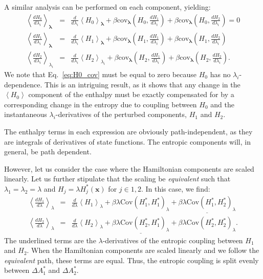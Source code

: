 \documentclass[%
 preprint,
 amsmath,amssymb,
 aps,
]{revtex4-1}
\renewcommand{\vec}[1]{{\bm{#1}}}
\begin{document}
A similar analysis can be performed on each component, yielding:
\begin{eqnarray}
\left<\frac{dH_0}{d\lambda_i}\right>_{\vec\lambda} &=& 
\frac{d}{d\lambda_i}\left<H_0\right>_{\vec\lambda} +
\beta\mathrm{cov}_{\vec\lambda}\left(H_0, \frac{dH_1}{d\lambda_i} \right)+
\beta\mathrm{cov}_{\vec\lambda}\left(H_0, \frac{dH_2}{d\lambda_i} \right)
\label{eq:H0_cov}=0\\
\left<\frac{dH_1}{d\lambda_i}\right>_{\vec\lambda} &=& 
\frac{d}{d\lambda_i}\left<H_1\right>_{\vec\lambda} +
\beta\mathrm{cov}_{\vec\lambda}\left(H_1, \frac{dH_1}{d\lambda_i} \right)+
\beta\mathrm{cov}_{\vec\lambda}\left(H_1, \frac{dH_2}{d\lambda_i} \right)\\
\left<\frac{dH_2}{d\lambda_i}\right>_{\lambda_i} &=& 
\frac{d}{d\lambda_i}\left<H_2\right>_{\lambda_i} +
\beta\mathrm{cov}_{\vec\lambda}\left(H_2, \frac{dH_1}{d\lambda_i} \right)+
\beta\mathrm{cov}_{\vec\lambda}\left(H_2, \frac{dH_2}{d\lambda_i} \right).
\end{eqnarray}
We note that Eq.~\ref{eq:H0_cov} must be equal to zero because $H_0$ has no $\lambda_i$-dependence. This is an intriguing result, as it shows that any change in the $\left<H_0\right>$ component of the enthalpy must be exactly compensated for by a corresponding change in the entropy due to coupling between $H_0$ and the instantaneous $\lambda_i$-derivatives of the perturbed components, $H_1$ and $H_2$.

The enthalpy terms in each expression are obviously path-independent, as they are integrals of derivatives of state functions. The entropic components will, in general, be path dependent.

However, let us consider the case where the Hamiltonian components are scaled linearly. Let us further stipulate that the scaling be \emph{equivalent} such that $\lambda_1 = \lambda_2 = \lambda$ and $H_j = \lambda H_j^*(\vec x)$ for $j\in{1,2}$. In this case, we find:
\begin{eqnarray}
\left<\frac{dH_1}{d\lambda}\right>_\lambda &=& 
\frac{d}{d\lambda}\left<H_1\right>_\lambda +
\beta\lambda\mathrm{Cov}\left(H_1^*,H_1^*\right)_\lambda+
\underline{\beta\lambda\mathrm{Cov}\left(H_1^*,H_2^*\right)_\lambda}\\
\left<\frac{dH_2}{d\lambda}\right>_\lambda &=& 
\frac{d}{d\lambda}\left<H_2\right>_\lambda +
\underline{\beta\lambda\mathrm{Cov}\left(H_2^*,H_1^* \right)_\lambda}+
\beta\lambda\mathrm{Cov}\left(H_2^*, H_2^* \right)_\lambda.
\end{eqnarray}
The underlined terms are the $\lambda$-derivatives of the entropic coupling between $H_1$ and $H_2$. When the Hamiltonian components are scaled linearly and we follow the \emph{equivalent} path, these terms are equal. Thus, the entropic coupling is split evenly between $\Delta A^*_1$ and $\Delta A^*_2$.
\end{document}
